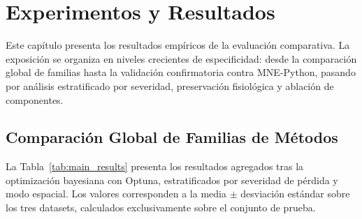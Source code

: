 \chapter{Experimentos y Resultados}

Este capítulo presenta los resultados empíricos de la evaluación comparativa. La exposición se organiza en niveles crecientes de especificidad: desde la comparación global de familias hasta la validación confirmatoria contra MNE-Python, pasando por análisis estratificado por severidad, preservación fisiológica y ablación de componentes.

\section{Comparación Global de Familias de Métodos}

La Tabla~\ref{tab:main_results} presenta los resultados agregados tras la optimización bayesiana con Optuna, estratificados por severidad de pérdida y modo espacial. Los valores corresponden a la media $\pm$ desviación estándar sobre los tres datasets, calculados exclusivamente sobre el conjunto de prueba.

\begin{table}[ht]
\centering
\caption{Resultados globales tras optimización con Optuna. MAE en $\times 10^{-6}$ y SNR en dB. Mejores valores por estrato en \textbf{negrita}.}
\label{tab:main_results}
\end{table}

